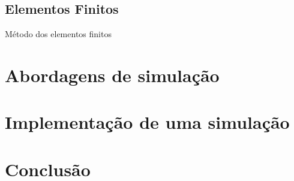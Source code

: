 \documentclass{beamer}
\begin{document}
		\subsection{Elementos Finitos}
		\begin{frame}{Método dos elementos finitos}
			
		\end{frame}
	\section{Abordagens de simulação}
	\section{Implementação de uma simulação}
	\section{Conclusão}
\end{document}
